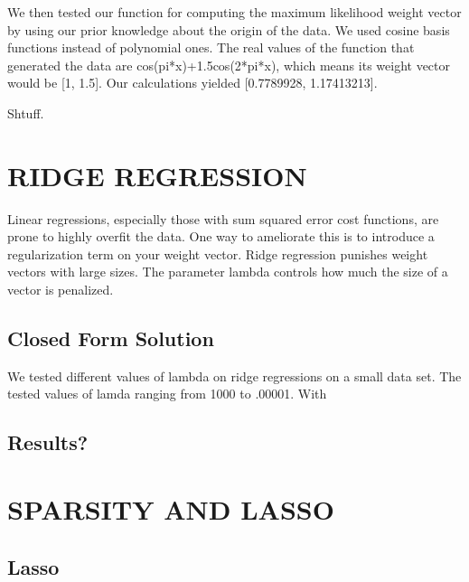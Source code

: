 \documentclass[a4paper,twoside]{article}
\begin{document}
We then tested our function for computing the maximum likelihood weight vector by using our prior knowledge about the origin of the data. We used cosine basis functions instead of polynomial ones. The real values of the function that generated the data are cos(pi*x)+1.5cos(2*pi*x), which means its weight vector would be [1, 1.5]. Our calculations yielded [0.7789928, 1.17413213]. 

Shtuff.


\section{\uppercase{Ridge Regression}}

Linear regressions, especially those with sum squared error cost functions, are prone to highly overfit the data. One way to ameliorate this is to introduce a regularization term on your weight vector. Ridge regression punishes weight vectors with large sizes. The parameter lambda controls how much the size of a vector is penalized. 

\subsection{Closed Form Solution}

We tested different values of lambda on ridge regressions on a small data set. The tested values of lamda ranging from 1000 to .00001. With 

\subsection{Results?}


\section{\uppercase{Sparsity and LASSO}}

\subsection{Lasso}



\vfill
\end{document}

